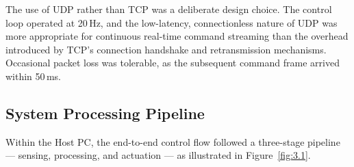 The use of UDP rather than TCP was a deliberate design choice. The control loop operated at 20\,Hz, and the low-latency, connectionless nature of UDP was more appropriate for continuous real-time command streaming than the overhead introduced by TCP’s connection handshake and retransmission mechanisms. Occasional packet loss was tolerable, as the subsequent command frame arrived within 50\,ms.

\subsection{System Processing Pipeline}

Within the Host PC, the end-to-end control flow followed a three-stage pipeline --- sensing, processing, and actuation --- as illustrated in Figure~\ref{fig:3.1}.


